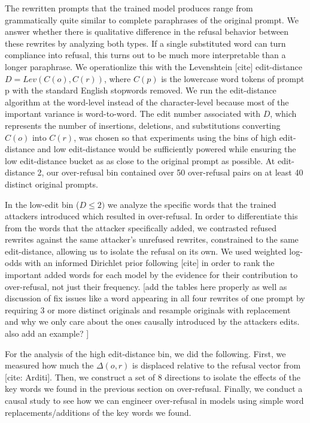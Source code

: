 \documentclass{article}
\begin{document}
The rewritten prompts that the trained model produces range from grammatically quite similar to complete paraphrases of the original prompt. We answer whether there is qualitative difference in the refusal behavior between these rewrites by analyzing both types. If a single substituted word can turn compliance into refusal, this turns out to be much more interpretable than a longer paraphrase. We operationlize this with the Levenshtein [cite] edit-distance $D = Lev(C(o), C(r))$, where $C(p)$ is the lowercase word tokens of prompt p with the standard English stopwords removed. We run the edit-distance algorithm at the word-level instead of the character-level because most of the important variance is word-to-word. The edit number associated with $D$, which represents the number of insertions, deletions, and substitutions converting $C(o)$ into $C(r)$, was chosen so that experiments using the bins of high edit-distance and low edit-distance would be sufficiently powered while ensuring the low edit-distance bucket as as close to the original prompt as possible. At edit-distance 2, our over-refusal bin contained over 50 over-refusal pairs on at least 40 distinct original prompts. 

In the low-edit bin ($D \leq 2)$ we analyze the specific words that the trained attackers introduced which resulted in over-refusal. In order to differentiate this from the words that the attacker specifically added, we contrasted refused rewrites against the same attacker's unrefused rewrites, constrained to the same edit-distance, allowing us to isolate the refusal on its own. We used weighted log-odds with an informed Dirichlet prior following [cite] in order to rank the important added words for each model by the evidence for their contribution to over-refusal, not just their frequency.  [add the tables here properly as well as discussion of fix issues like a word appearing in all four rewrites of one prompt by requiring 3 or more distinct originals and resample originals with replacement and why we only care about the ones causally introduced by the attackers edits. also add an example? ]

For the analysis of the high edit-distance bin, we did the following. 
First, we measured how much the $\Delta(o, r)$ is displaced relative to the refusal vector from [cite: Arditi]. Then, we construct a set of 8 directions to isolate the effects of the key words we found in the previous section on over-refusal. Finally, we conduct a causal study to see how we can engineer over-refusal in models using simple word replacements/additions of the key words we found. 
\end{document}
